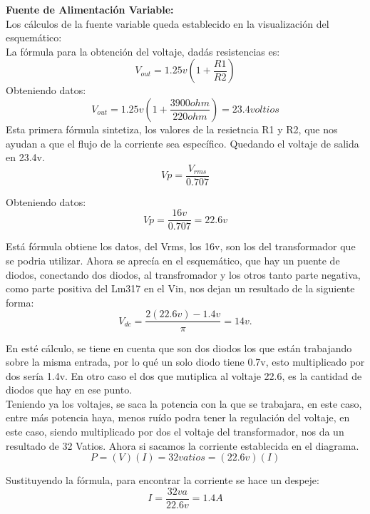 \documentclass[14pt,a4paper]{article}
\begin{document}
\textbf{Fuente de Alimentación Variable:\\}
Los cálculos de la fuente variable queda establecido en la visualización del esquemático:\\
La fórmula para la obtención del voltaje, dadás resistencias es:\\
$$ V_{out}= 1.25v(1+\frac{R1}{R2}) $$
Obteniendo datos:\\
$$ V_{out}= 1.25v(1+\frac{3900 ohm}{220 ohm})=23.4 voltios $$
Esta primera fórmula sintetiza, los valores de la resietncia R1 y R2, que nos ayudan a que el flujo de la corriente sea específico. Quedando el voltaje de salida en 23.4v.\\

$$ Vp= \frac{V_{rms}}{0.707} $$

Obteniendo datos:\\

$$ Vp=\frac{16v}{0.707}= 22.6 v $$

Está fórmula obtiene los datos, del Vrms, los 16v, son los del transformador que se podria utilizar. Ahora se aprecía en el esquemático, que hay un puente de diodos, conectando dos diodos, al transfromador y los otros tanto parte negativa, como parte positiva del Lm317 en el Vin, nos dejan un resultado de la siguiente forma:\\

$$ V_{dc}=\frac{2(22.6v)-1.4v}{\pi}= 14 v. $$

En esté cálculo, se tiene en cuenta que son dos diodos los que están trabajando sobre la misma entrada, por lo qué un solo diodo tiene 0.7v, esto multiplicado por dos sería 1.4v. En otro caso el dos que mutiplica al voltaje 22.6, es la cantidad de diodos que hay en ese punto.\\
Teniendo ya los voltajes, se saca la potencia con la que se trabajara, en este caso, entre más potencia haya, menos ruído podra tener la regulación del voltaje, en este caso, siendo multiplicado por dos el voltaje del transformador, nos da un resultado de 32 Vatios. Ahora si sacamos la corriente establecida en el diagrama.\\

$$ P= (V)(I)= 32vatios=(22.6v)(I) $$

Sustituyendo la fórmula, para encontrar la corriente se hace un despeje:\\

$$ I= \frac{32va}{22.6v}= 1.4 A $$
\end{document}
